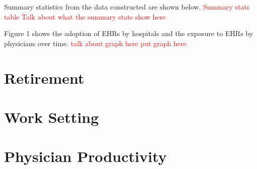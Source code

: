 \documentclass[11pt]{article}
\begin{document}
Summary statistics from the data constructed are shown below. \textcolor{red}{Summary stats table} \textcolor{red}{Talk about what the summary stats show here}

Figure 1 shows the adoption of EHRs by hospitals and the exposure to EHRs by physicians over time. \textcolor{red}{talk about graph here} \textcolor{red}{put graph here}



\section{Retirement}

\section{Work Setting}

\section{Physician Productivity}
\end{document}
